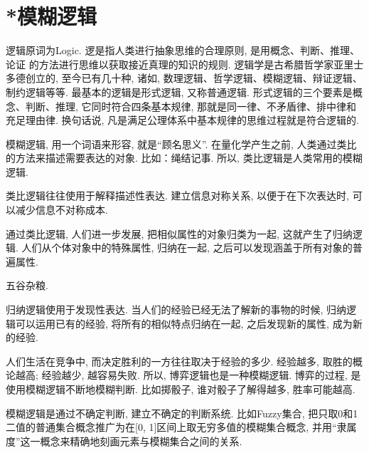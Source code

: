 \section{*模糊逻辑}
逻辑原词为Logic. 逻是指人类进行抽象思维的合理原则, 是用概念、判断、推理、论证 的方法进行思维以获取接近真理的知识的规则. 逻辑学是古希腊哲学家亚里士多德创立的, 至今已有几十种, 诸如, 数理逻辑、哲学逻辑、模糊逻辑、辩证逻辑、制约逻辑等等. 最基本的逻辑是形式逻辑, 又称普通逻辑. 形式逻辑的三个要素是概念、判断、推理, 它同时符合四条基本规律, 那就是同一律、不矛盾律、排中律和充足理由律. 换句话说, 凡是满足公理体系中基本规律的思维过程就是符合逻辑的.

模糊逻辑, 用一个词语来形容, 就是“顾名思义”. 在量化学产生之前, 人类通过类比的方法来描述需要表达的对象. 比如：绳结记事. 所以, 类比逻辑是人类常用的模糊逻辑.

类比逻辑往往使用于解释描述性表达. 建立信息对称关系, 以便于在下次表达时, 可以减少信息不对称成本.

通过类比逻辑, 人们进一步发展, 把相似属性的对象归类为一起, 这就产生了归纳逻辑. 人们从个体对象中的特殊属性, 归纳在一起, 之后可以发现涵盖于所有对象的普遍属性.
\begin{example}
  五谷杂粮.
\end{example}

归纳逻辑使用于发现性表达. 当人们的经验已经无法了解新的事物的时候, 归纳逻辑可以运用已有的经验, 将所有的相似特点归纳在一起, 之后发现新的属性, 成为新的经验.

人们生活在竞争中, 而决定胜利的一方往往取决于经验的多少. 经验越多, 取胜的概论越高; 经验越少, 越容易失败. 所以, 博弈逻辑也是一种模糊逻辑. 博弈的过程, 是使用模糊逻辑不断地模糊判断. 比如掷骰子, 谁对骰子了解得越多, 胜率可能越高.

模糊逻辑是通过不确定判断, 建立不确定的判断系统. 比如Fuzzy集合, 把只取0和1二值的普通集合概念推广为在[0, 1]区间上取无穷多值的模糊集合概念, 并用“隶属度”这一概念来精确地刻画元素与模糊集合之间的关系.

